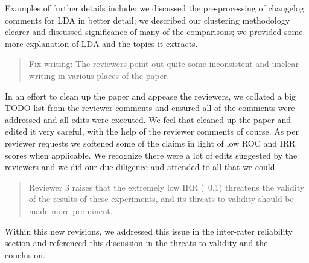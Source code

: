 \documentclass{article}
\begin{document}
Examples of further details include: we discussed the pre-processing
of changelog comments for LDA in better detail; we described our
clustering methodology clearer and discussed significance of many of
the comparisons; we provided some more explanation of LDA and the
topics it extracts.

\begin{comment}
         - Re: in the "Creating a Validation Corpus" we addressed why we
           used ROC over F-Measure: class imbalance leads to bias in
           F-Measure. And we cited relevant work that discussed this
           particular issue.            

         - Re: we explained some reasons for low ROC scores.

         - Re: in threats to validity, internal validity, we discussed skewed classes

     - Re: we responded on page 6 and in the threats to validity about
       the issues of a single domain

    - Re: discussed LDA word distributions

    - in the clustering section we described our methodology clearer
    - we better described LDA preprocessing
\end{comment}

\begin{quotation}
  Fix writing: The reviewers point out quite some inconsistent and
  unclear writing in various places of the paper.
\end{quotation}

In an effort to clean up the paper and appease the reviewers, we
collated a big TODO list from the reviewer comments and ensured all of
the comments were addressed and all edits were executed. We feel that
cleaned up the paper and edited it very careful, with the help of the
reviewer comments of course.  As per reviewer requests we softened
some of the claims in light of low ROC and IRR scores when applicable.
We recognize there were a lot of edits suggested by the reviewers and
we did our due diligence and attended to all that we could.

\begin{quotation}
 Reviewer 3 raises that the extremely low IRR (~0.1) threatens the
   validity of the results of these experiments, and its threats to
   validity should be made more prominent.
  
\end{quotation}

Within this new revisions, we addressed this issue in the inter-rater
reliability section and referenced this discussion in the threats to
validity and the conclusion. 
\end{document}
